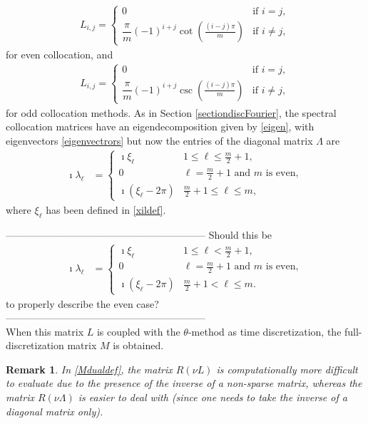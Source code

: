 \documentclass[a4paper]{article}
\newtheorem{remark}{Remark}
\begin{document}
\begin{align*}
	L_{i,j} = \begin{cases}
						0 & \text{if } i = j, \\[10pt]
						\dfrac{\pi}{m}(-1)^{i+j}\cot{\!\left(\frac{(i-j)\pi}{m}\right)} & \text{if } i \neq j,
					\end{cases}
\end{align*}
for even collocation, and
\begin{align*}
	L_{i,j} = \begin{cases}
						0 & \text{if } i = j, \\[10pt]
						\dfrac{\pi}{m}(-1)^{i+j}\csc{\!\left(\frac{(i-j)\pi}{m}\right)} & \text{if } i \neq j,
					\end{cases}
\end{align*}
for odd collocation methods.
As in Section \ref{sectiondiscFourier}, the spectral collocation matrices have an eigendecomposition given by
\eqref{eigen}, with eigenvectors \eqref{eigenvectrors} but now the entries of the diagonal matrix $\Lambda$ are
\begin{align}
    \imath\lambda_\ell & =
    \begin{cases}
        \imath\xi_\ell & 1 \le \ell \le \frac{m}{2}+1, \\
        0 & \ell = \frac{m}{2}+1 \text{ and } m \text{ is even}, \\
        \imath(\xi_\ell - 2\pi) & \frac{m}{2}+1 \le \ell \le m,
    \end{cases}
\end{align}
where $\xi_\ell$ has been defined in \eqref{xildef}.


------------------------------------------------------------
Should this be
\begin{align}
    \imath\lambda_\ell & =
    \begin{cases}
        \imath\xi_\ell & 1 \le \ell < \frac{m}{2}+1, \\
        0 & \ell = \frac{m}{2}+1 \text{ and } m \text{ is even}, \\
        \imath(\xi_\ell - 2\pi) & \frac{m}{2}+1 < \ell \le m.
    \end{cases}
\end{align}
to properly describe the even case?\\
------------------------------------------------------------\\

When this matrix $L$ is coupled with the $\theta$-method as time discretization, the full-discretization matrix $M$ is obtained. 
\begin{remark} 
In \eqref{Mdualdef}, the matrix $R(\nu L)$ is computationally more difficult to evaluate due to the presence of the inverse of a non-sparse matrix, whereas the matrix $R(\nu \Lambda)$ is easier to deal with (since one needs to take the inverse of a diagonal matrix only).
\end{remark} 
\end{document}
